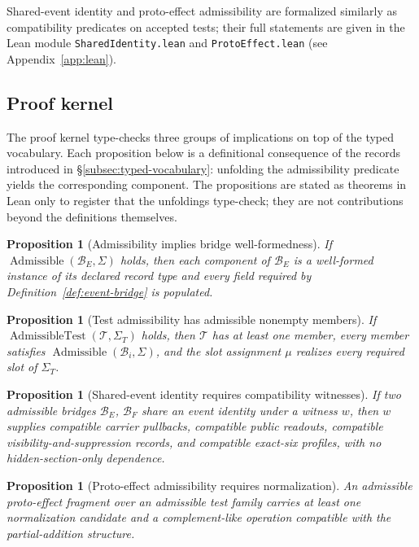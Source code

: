 \documentclass[11pt]{article}
\newtheorem{proposition}[theorem]{Proposition}
\theoremstyle{definition}
\begin{document}
Shared-event identity and proto-effect admissibility are formalized similarly as compatibility predicates on accepted tests; their full statements are given in the Lean module \texttt{SharedIdentity.lean} and \texttt{ProtoEffect.lean} (see Appendix~\ref{app:lean}).

\subsection{Proof kernel}
\label{subsec:proof-kernel}

The proof kernel type-checks three groups of implications on top of the typed vocabulary. Each proposition below is a definitional consequence of the records introduced in \S\ref{subsec:typed-vocabulary}: unfolding the admissibility predicate yields the corresponding component. The propositions are stated as theorems in Lean only to register that the unfoldings type-check; they are not contributions beyond the definitions themselves.

\begin{proposition}[Admissibility implies bridge well-formedness]
\label{prop:admissibility-well-formed}
If $\operatorname{Admissible}(\mathcal{B}_E, \Sigma)$ holds, then each component of $\mathcal{B}_E$ is a well-formed instance of its declared record type and every field required by Definition~\ref{def:event-bridge} is populated.
\end{proposition}

\begin{proposition}[Test admissibility has admissible nonempty members]
\label{prop:test-admissible-members}
If $\operatorname{AdmissibleTest}(\mathcal{T}, \Sigma_T)$ holds, then $\mathcal{T}$ has at least one member, every member satisfies $\operatorname{Admissible}(\mathcal{B}_i, \Sigma)$, and the slot assignment $\mu$ realizes every required slot of $\Sigma_T$.
\end{proposition}

\begin{proposition}[Shared-event identity requires compatibility witnesses]
\label{prop:shared-identity-compat}
If two admissible bridges $\mathcal{B}_E$, $\mathcal{B}_F$ share an event identity under a witness $w$, then $w$ supplies compatible carrier pullbacks, compatible public readouts, compatible visibility-and-suppression records, and compatible exact-six profiles, with no hidden-section-only dependence.
\end{proposition}

\begin{proposition}[Proto-effect admissibility requires normalization]
\label{prop:proto-effect-normalization}
An admissible proto-effect fragment over an admissible test family carries at least one normalization candidate and a complement-like operation compatible with the partial-addition structure.
\end{proposition}
\end{document}
